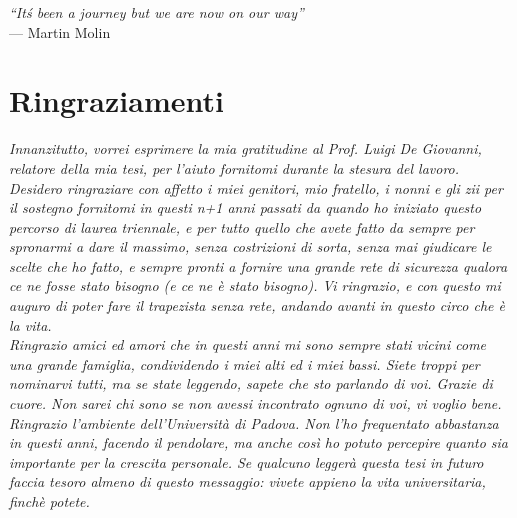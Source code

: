 
\cleardoublepage
{}
{}

\begin{flushright}{
	\slshape    
	``It\'s been a journey but we are now on our way''} \\ 
	\medskip
    --- Martin Molin
\end{flushright}


\bigskip

\begingroup
\let\clearpage\relax
\let\cleardoublepage\relax
\let\cleardoublepage\relax

\chapter*{Ringraziamenti}

\noindent \textit{Innanzitutto, vorrei esprimere la mia gratitudine al Prof. Luigi De Giovanni, relatore della mia tesi, per l'aiuto fornitomi durante la stesura del lavoro.}\\

\noindent \textit{Desidero ringraziare con affetto i miei genitori, mio fratello, i nonni e gli zii per il sostegno fornitomi in questi n+1 anni passati da quando ho iniziato questo percorso di laurea triennale, e per tutto quello che avete fatto da sempre per spronarmi a dare il massimo, senza costrizioni di sorta, senza mai giudicare le scelte che ho fatto, e sempre pronti a fornire una grande rete di sicurezza qualora ce ne fosse stato bisogno (e ce ne è stato bisogno). Vi ringrazio, e con questo mi auguro di poter fare il trapezista senza rete, andando avanti in questo circo che è la vita.}\\

\noindent \textit{Ringrazio amici ed amori che in questi anni mi sono sempre stati vicini come una grande famiglia, condividendo i miei alti ed i miei bassi. Siete troppi per nominarvi tutti, ma se state leggendo, sapete che sto parlando di voi. Grazie di cuore. Non sarei chi sono se non avessi incontrato ognuno di voi, vi voglio bene.}\\

\noindent \textit{Ringrazio l'ambiente dell'Università di Padova. Non l'ho frequentato abbastanza in questi anni, facendo il pendolare, ma anche così ho potuto percepire quanto sia importante per la crescita personale. Se qualcuno leggerà questa tesi in futuro faccia tesoro almeno di questo messaggio: vivete appieno la vita universitaria, finchè potete.}\\

